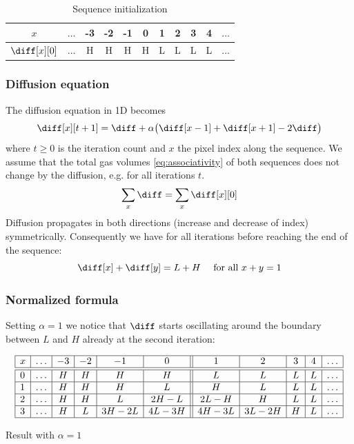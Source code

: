 \begin{table}[ht]
    \centering
    \begin{tabular}{|c|c|c|c|c|c||c|c|c|c|c|} \hline
        $x$           & $\ldots$ &-3 &-2 &-1 & 0 & 1 & 2 & 3 & 4 & $\ldots$ \\ \hline \hline
        $\diff[x][0]$ & $\ldots$ & H & H & H & H & L & L & L & L & $\ldots$ \\ \hline
    \end{tabular}
    \caption{Sequence initialization}
    \label{tab:init}
\end{table}

\subsubsection{Diffusion equation}

The diffusion equation in 1D becomes
%
\begin{equation}
    \diff[x][t+1] = \diff + \alpha \big(\diff[x-1] + \diff[x+1] - 2 \diff \big)
    \label{eq:1D:iterative}
\end{equation}
%
where $t \ge 0$ is the iteration count and $x$ the pixel index along the sequence. 
%
We assume that the total gas volumes \eqref{eq:associativity} of both sequences 
does not change by the diffusion, e.g. for all iterations $t$.
%
\begin{equation}\label{eq:associativity}
    \sum_x \diff = \sum_x \diff[x][0]
\end{equation}
%
Diffusion propagates in both directions (increase and decrease of index) symmetrically.
Consequently we have for all iterations before reaching the end of the sequence:
%
\begin{equation}\label{eq:symmetry}
    \diff[x] + \diff[y] = L+H \quad \mbox{ for all } x+y=1
\end{equation}

\subsubsection{Normalized formula}

Setting $\alpha=1$ we notice that $\diff$ starts oscillating 
around the boundary between $L$ and $H$ already at the second iteration:

\begin{table}[ht]
    \centering
    $$
        \begin{array}{|l|c|c|c|c|c||c|c|c|c|c|} \hline
        x&\ldots &-3 &-2 &-1   & 0   & 1    & 2   & 3 & 4 & \ldots \\ \hline \hline
        0&\ldots & H & H & H   & H   & L    & L   & L & L & \ldots \\ \hline
        1&\ldots & H & H & H   & L   & H    & L   & L & L & \ldots \\ \hline
        2&\ldots & H & H & L   &2H-L & 2L-H & H   & L & L & \ldots \\ \hline
        3&\ldots & H & L &3H-2L&4L-3H& 4H-3L&3L-2H& H & L & \ldots \\ \hline 
        \end{array}
    $$
    \caption{Result with $\alpha=1$}
    \label{tab:1D:result_a1}
\end{table}


